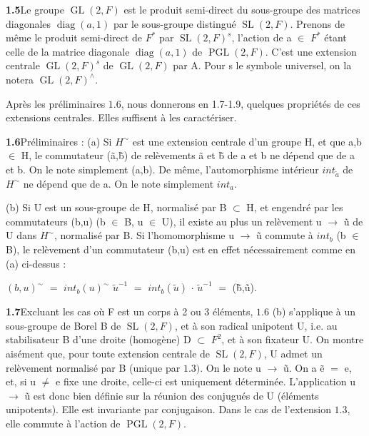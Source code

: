 \documentclass[10pt,a4paper]{article}
\begin{document}
\clearpage
{}
\label{d035-physical-010}
\par\noindent\textbf{1.5}\quad Le groupe $\operatorname{GL}(2,F)$ est le produit semi-direct du sous-groupe des matrices diagonales $\operatorname{diag}(a,1)$ par le sous-groupe distingué $\operatorname{SL}(2,F)$. Prenons de même le produit semi-direct de $F^*$ par $\operatorname{SL}(2,F)^s$, l'action de a $\in{}$ $F^*$ étant celle de la matrice diagonale $\operatorname{diag}(a,1)$ de $\operatorname{PGL}(2,F)$. C'est une extension centrale $\operatorname{GL}(2,F)^s$ de $\operatorname{GL}(2,F)$ par A. Pour s le symbole universel, on la notera $\operatorname{GL}(2,F)^\wedge{}$.\par
\par Après les préliminaires $1.6$, nous donnerons en 1.7-1.9, quelques propriétés de ces extensions centrales. Elles suffisent à les caractériser.\par
\par\noindent\textbf{1.6}\quad Préliminaires : (a) Si $H^\sim$ est une extension centrale d'un groupe H, et que a,b $\in{}$ H, le commutateur (ã,b̃) de relèvements ã et b̃ de a et b ne dépend que de a et b. On le note simplement (a,b). De même, l'automorphisme intérieur $int_{\widetilde{a}}$ de $H^\sim$ ne dépend que de a. On le note simplement $int_a$.\par
\par (b) Si U est un sous-groupe de H, normalisé par B $\subset{}$ H, et engendré par les commutateurs (b,u) (b $\in{}$ B, u $\in{}$ U), il existe au plus un relèvement u $\to{}$ ũ de U dans $H^\sim$, normalisé par B. Si l'homomorphisme u $\to{}$ ũ commute à $int_b$ (b $\in{}$ B), le relèvement d'un commutateur (b,u) est en effet nécessairement comme en (a) ci-dessus :\par
\par\smallskip\begin{center}\begin{minipage}{0.96\textwidth}\centering
$(b,u)^\sim$ $=$ $int_b(u)^\sim$ $\widetilde{u}^{-1}$ $=$ $int_b(\widetilde{u})$ $\cdot{}$ $\widetilde{u}^{-1}$ $=$ (b̃,ũ).
\end{minipage}\end{center}\smallskip
\par\noindent\textbf{1.7}\quad Excluant les cas où F est un corps à 2 ou 3 éléments, $1.6$ (b) s'applique à un sous-groupe de Borel B de $\operatorname{SL}(2,F)$, et à son radical unipotent U, i.e. au stabilisateur B d'une droite (homogène) D $\subset{}$ $F^2$, et à son fixateur U. On montre aisément que, pour toute extension centrale de $\operatorname{SL}(2,F)$, U admet un relèvement normalisé par B (unique par $1.3)$. On le note u $\to{}$ ũ. On a ẽ $=$ e, et, si u $\ne{}$ e fixe une droite, celle-ci est uniquement déterminée. L'application u $\to{}$ ũ est donc bien définie sur la réunion des conjugués de U (éléments unipotents). Elle est invariante par conjugaison. Dans le cas de l'extension $1.3$, elle commute à l'action de $\operatorname{PGL}(2,F)$.\par
\end{document}
